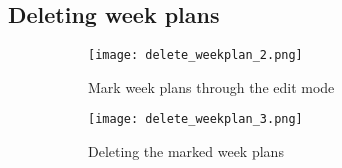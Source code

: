 \subsection{Deleting week plans}

\begin{figure}[H]
    \begin{subfigure}{0.5\textwidth}
    \texttt{[image: delete\_weekplan\_2.png]}
    \caption{Mark week plans through the edit mode}
    \label{subfig:delete_weekplan_2}
    \end{subfigure}
    \begin{subfigure}{0.5\textwidth}
        \texttt{[image: delete\_weekplan\_3.png]}
    \caption{Deleting the marked week plans}
    \label{subfig:delete_weekplan_3}
    \end{subfigure} 
    \caption{}
    \label{fig:delete_weekplan}
\end{figure}